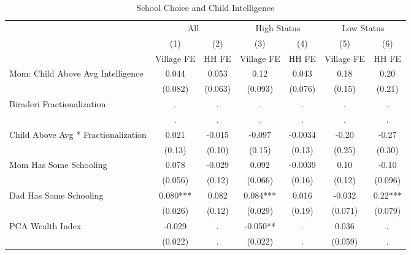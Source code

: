 \begin{table}[htbp]\centering
\def\sym#1{\ifmmode^{#1}\else\(^{#1}\)\fi}
\caption{School Choice and Child Intelligence\label{hhselectioninteraction}}
\begin{tabular}{l*{6}{c}}
\hline\hline
                &\multicolumn{2}{c}{All}  &\multicolumn{2}{c}{High Status}&\multicolumn{2}{c}{Low Status}\\\cmidrule(lr){2-3}\cmidrule(lr){4-5}\cmidrule(lr){6-7}
                &\multicolumn{1}{c}{(1)}&\multicolumn{1}{c}{(2)}&\multicolumn{1}{c}{(3)}&\multicolumn{1}{c}{(4)}&\multicolumn{1}{c}{(5)}&\multicolumn{1}{c}{(6)}\\
                &\multicolumn{1}{c}{Village FE}&\multicolumn{1}{c}{HH FE}&\multicolumn{1}{c}{Village FE}&\multicolumn{1}{c}{HH FE}&\multicolumn{1}{c}{Village FE}&\multicolumn{1}{c}{HH FE}\\
\hline
Mom: Child Above Avg Intelligence&    0.044   &    0.053   &     0.12   &    0.043   &     0.18   &     0.20   \\
                &  (0.082)   &  (0.063)   &  (0.093)   &  (0.076)   &   (0.15)   &   (0.21)   \\
Biraderi Fractionalization&        .   &        .   &        .   &        .   &        .   &        .   \\
                &        .   &        .   &        .   &        .   &        .   &        .   \\
Child Above Avg * Fractionalization&    0.021   &   -0.015   &   -0.097   &  -0.0034   &    -0.20   &    -0.27   \\
                &   (0.13)   &   (0.10)   &   (0.15)   &   (0.13)   &   (0.25)   &   (0.30)   \\
Mom Has Some Schooling&    0.078   &   -0.029   &    0.092   &  -0.0039   &     0.10   &    -0.10   \\
                &  (0.056)   &   (0.12)   &  (0.066)   &   (0.16)   &   (0.12)   &  (0.096)   \\
Dad Has Some Schooling&    0.080***&    0.082   &    0.084***&    0.016   &   -0.032   &     0.22***\\
                &  (0.026)   &   (0.12)   &  (0.029)   &   (0.19)   &  (0.071)   &  (0.079)   \\
PCA Wealth Index&   -0.029   &        .   &   -0.050** &        .   &    0.036   &        .   \\
                &  (0.022)   &        .   &  (0.022)   &        .   &  (0.059)   &        .   \\

\end{tabular}
\end{table}
